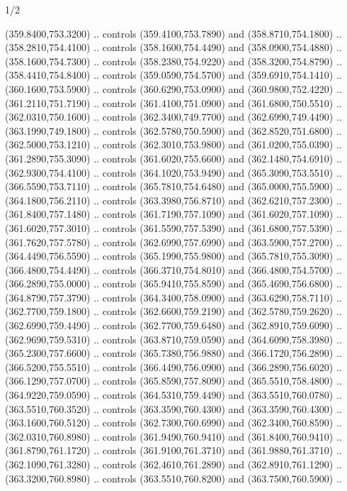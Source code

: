 \begin{flagdescription}{1/2}
\begin{scope}[xshift=0.5\flaglength]
\begin{scope}[scale=0.00745\flagwidth,xshift=-12.1mm,yshift=41.7mm]
\begin{scope}[y=0.80pt, x=0.80pt, yscale=-1, xscale=1, inner sep=0pt, outer sep=0pt]
\begin{scope}[cm={{1.33333,0.0,0.0,-1.33333,(0.0,114.66667)}}]
\begin{scope}[scale=0.100]
  (359.8400,753.3200) .. controls (359.4100,753.7890) and (358.8710,754.1800) ..
  (358.2810,754.4100) .. controls (358.1600,754.4490) and (358.0900,754.4880) ..
  (358.1600,754.7300) .. controls (358.2380,754.9220) and (358.3200,754.8790) ..
  (358.4410,754.8400) .. controls (359.0590,754.5700) and (359.6910,754.1410) ..
  (360.1600,753.5900) .. controls (360.6290,753.0900) and (360.9800,752.4220) ..
  (361.2110,751.7190) .. controls (361.4100,751.0900) and (361.6800,750.5510) ..
  (362.0310,750.1600) .. controls (362.3400,749.7700) and (362.6990,749.4490) ..
  (363.1990,749.1800) .. controls (362.5780,750.5900) and (362.8520,751.6800) ..
  (362.5000,753.1210) .. controls (362.3010,753.9800) and (361.0200,755.0390) ..
  (361.2890,755.3090) .. controls (361.6020,755.6600) and (362.1480,754.6910) ..
  (362.9300,754.4100) .. controls (364.1020,753.9490) and (365.3090,753.5510) ..
  (366.5590,753.7110) .. controls (365.7810,754.6480) and (365.0000,755.5900) ..
  (364.1800,756.2110) .. controls (363.3980,756.8710) and (362.6210,757.2300) ..
  (361.8400,757.1480) .. controls (361.7190,757.1090) and (361.6020,757.1090) ..
  (361.6020,757.3010) .. controls (361.5590,757.5390) and (361.6800,757.5390) ..
  (361.7620,757.5780) .. controls (362.6990,757.6990) and (363.5900,757.2700) ..
  (364.4490,756.5590) .. controls (365.1990,755.9800) and (365.7810,755.3090) ..
  (366.4800,754.4490) .. controls (366.3710,754.8010) and (366.4800,754.5700) ..
  (366.2890,755.0000) .. controls (365.9410,755.8590) and (365.4690,756.6800) ..
  (364.8790,757.3790) .. controls (364.3400,758.0900) and (363.6290,758.7110) ..
  (362.7700,759.1800) .. controls (362.6600,759.2190) and (362.5780,759.2620) ..
  (362.6990,759.4490) .. controls (362.7700,759.6480) and (362.8910,759.6090) ..
  (362.9690,759.5310) .. controls (363.8710,759.0590) and (364.6090,758.3980) ..
  (365.2300,757.6600) .. controls (365.7380,756.9880) and (366.1720,756.2890) ..
  (366.5200,755.5510) .. controls (366.4490,756.0900) and (366.2890,756.6020) ..
  (366.1290,757.0700) .. controls (365.8590,757.8090) and (365.5510,758.4800) ..
  (364.9220,759.0590) .. controls (364.5310,759.4490) and (363.5510,760.0780) ..
  (363.5510,760.3520) .. controls (363.3590,760.4300) and (363.3590,760.4300) ..
  (363.1600,760.5120) .. controls (362.7300,760.6990) and (362.3400,760.8590) ..
  (362.0310,760.8980) .. controls (361.9490,760.9410) and (361.8400,760.9410) ..
  (361.8790,761.1720) .. controls (361.9100,761.3710) and (361.9880,761.3710) ..
  (362.1090,761.3280) .. controls (362.4610,761.2890) and (362.8910,761.1290) ..
  (363.3200,760.8980) .. controls (363.5510,760.8200) and (363.7500,760.5900) ..

\end{scope}
\end{scope}
\end{scope}
\end{scope}
\end{scope}
\end{flagdescription}

